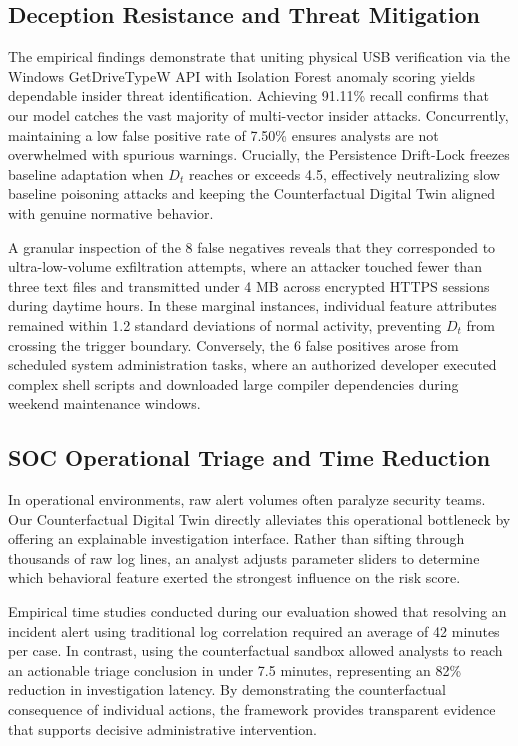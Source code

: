 \documentclass[conference]{IEEEtran}
\begin{document}
\subsection{Deception Resistance and Threat Mitigation}
The empirical findings demonstrate that uniting physical USB verification via the Windows GetDriveTypeW API with Isolation Forest anomaly scoring yields dependable insider threat identification. Achieving 91.11\% recall confirms that our model catches the vast majority of multi-vector insider attacks. Concurrently, maintaining a low false positive rate of 7.50\% ensures analysts are not overwhelmed with spurious warnings. Crucially, the Persistence Drift-Lock freezes baseline adaptation when $D_t$ reaches or exceeds 4.5, effectively neutralizing slow baseline poisoning attacks and keeping the Counterfactual Digital Twin aligned with genuine normative behavior.

A granular inspection of the 8 false negatives reveals that they corresponded to ultra-low-volume exfiltration attempts, where an attacker touched fewer than three text files and transmitted under 4 MB across encrypted HTTPS sessions during daytime hours. In these marginal instances, individual feature attributes remained within 1.2 standard deviations of normal activity, preventing $D_t$ from crossing the trigger boundary. Conversely, the 6 false positives arose from scheduled system administration tasks, where an authorized developer executed complex shell scripts and downloaded large compiler dependencies during weekend maintenance windows.

\subsection{SOC Operational Triage and Time Reduction}
In operational environments, raw alert volumes often paralyze security teams. Our Counterfactual Digital Twin directly alleviates this operational bottleneck by offering an explainable investigation interface. Rather than sifting through thousands of raw log lines, an analyst adjusts parameter sliders to determine which behavioral feature exerted the strongest influence on the risk score.

Empirical time studies conducted during our evaluation showed that resolving an incident alert using traditional log correlation required an average of 42 minutes per case. In contrast, using the counterfactual sandbox allowed analysts to reach an actionable triage conclusion in under 7.5 minutes, representing an 82\% reduction in investigation latency. By demonstrating the counterfactual consequence of individual actions, the framework provides transparent evidence that supports decisive administrative intervention.
\end{document}
